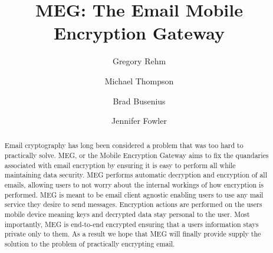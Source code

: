 \documentclass[10pt]{article}
\begin{document}
\title{MEG: The Email Mobile Encryption Gateway}

\author{Gregory Rehm} \author{Michael Thompson} \author{Brad Busenius} \author{Jennifer Fowler}


\maketitle

\begin{abstract}
\par Email cryptography has long been considered a problem that was too hard to practically solve. MEG, or the Mobile Encryption Gateway aims to fix the quandaries associated with email encryption by ensuring it is easy to perform all while maintaining data security. MEG performs automatic decryption and encryption of all emails, allowing users to not worry about the internal workings of how encryption is performed. MEG is meant to be email client agnostic enabling users to use any mail service they desire to send messages. Encryption actions are performed on the users mobile device meaning keys and decrypted data stay personal to the user. Most importantly, MEG is end-to-end encrypted ensuring that a users information stays private only to them. As a result we hope that MEG will finally provide supply the solution to the problem of practically encrypting email.
\end{abstract}
\end{document}
